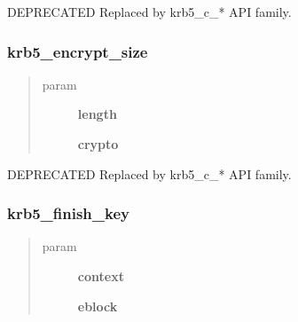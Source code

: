 \documentclass[letterpaper,10pt,english]{sphinxmanual}
\begin{document}
DEPRECATED Replaced by krb5\_c\_* API family.


\subsubsection{krb5\_encrypt\_size}
\label{appdev/refs/api/krb5_encrypt_size:krb5-encrypt-size}\label{appdev/refs/api/krb5_encrypt_size::doc}

\begin{fulllineitems}
\label{appdev/refs/api/krb5_encrypt_size:c.krb5_encrypt_size}
\end{fulllineitems}

\begin{quote}\begin{description}
\item[{param}] \leavevmode
\textbf{length}

\textbf{crypto}

\end{description}\end{quote}

DEPRECATED Replaced by krb5\_c\_* API family.


\subsubsection{krb5\_finish\_key}
\label{appdev/refs/api/krb5_finish_key:krb5-finish-key}\label{appdev/refs/api/krb5_finish_key::doc}

\begin{fulllineitems}
\label{appdev/refs/api/krb5_finish_key:c.krb5_finish_key}
\end{fulllineitems}

\begin{quote}\begin{description}
\item[{param}] \leavevmode
\textbf{context}

\textbf{eblock}

\end{description}\end{quote}
\end{document}
